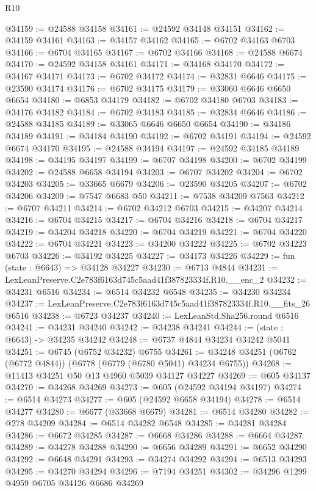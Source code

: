 \begin{lexlean}{R10}
\begin{coremodule}
@34159 := @24588 @34158
@34161 := @24592 @34148 @34151
@34162 := @34159 @34161
@34163 := @34157 @34162
@34165 := @6702 @34163 @6703
@34166 := @6704 @34165
@34167 := @6702 @34166
@34168 := @24588 @6674
@34170 := @24592 @34158 @34161
@34171 := @34168 @34170
@34172 := @34167 @34171
@34173 := @6702 @34172
@34174 := @32831 @6646
@34175 := @23590 @34174
@34176 := @6702 @34175
@34179 := @33060 @6646 @6650 @6654
@34180 := @6853 @34179
@34182 := @6702 @34180 @6703
@34183 := @34176 @34182
@34184 := @6702 @34183
@34185 := @32834 @6646
@34186 := @24588 @34185
@34189 := @33065 @6646 @6650 @6654
@34190 := @34186 @34189
@34191 := @34184 @34190
@34192 := @6702 @34191
@34194 := @24592 @6674 @34170
@34195 := @24588 @34194
@34197 := @24592 @34185 @34189
@34198 := @34195 @34197
@34199 := @6707 @34198
@34200 := @6702 @34199
@34202 := @24588 @6658 @34194
@34203 := @6707 @34202
@34204 := @6702 @34203
@34205 := @33665 @6679
@34206 := @23590 @34205
@34207 := @6702 @34206
@34209 := @7547 @6683 @50
@34211 := @7538 @34209 @7563
@34212 := @6707 @34211
@34214 := @6702 @34212 @6703
@34215 := @34207 @34214
@34216 := @6704 @34215
@34217 := @6704 @34216
@34218 := @6704 @34217
@34219 := @34204 @34218
@34220 := @6704 @34219
@34221 := @6704 @34220
@34222 := @6704 @34221
@34223 := @34200 @34222
@34225 := @6702 @34223 @6703
@34226 := @34192 @34225
@34227 := @34173 @34226
@34229 := fun (state : @6643) => @34128 @34227
@34230 := @6713 @4844
@34231 := LexLeanPreserve.C2e783f6163d745c5aad41f387823334f.R10.__enc_2
@34232 := @34231 @6516
@34234 := @6514 @34232 @6548
@34235 := @34230 @34234
@34237 := LexLeanPreserve.C2e783f6163d745c5aad41f387823334f.R10.__fits_26 @6516
@34238 := @6723 @34237
@34240 := LexLeanStd.Sha256.round @6516
@34241 := @34231 @34240
@34242 := @34238 @34241
@34244 := (state : @6643) -> @34235 @34242
@34248 := @6737 @4844 @34234 @34242 @5041
@34251 := @6745 (@6752 @34232) @6755
@34261 := @34248 @34251 (@6762 (@6772 @4844)) (@6778 (@6779 (@6780 @5041) @34234 @6755))
@34268 := @11413 @34251 @50 @13 @4960 @5039 @34127 @34227
@34269 := @605 @34137
@34270 := @34268 @34269
@34273 := @605 (@24592 @34194 @34197)
@34274 := @6514 @34273
@34277 := @605 (@24592 @6658 @34194)
@34278 := @6514 @34277
@34280 := @6677 (@33668 @6679)
@34281 := @6514 @34280
@34282 := @278 @34209
@34284 := @6514 @34282 @6548
@34285 := @34281 @34284
@34286 := @6672 @34285
@34287 := @6668 @34286
@34288 := @6664 @34287
@34289 := @34278 @34288
@34290 := @6656 @34289
@34291 := @6652 @34290
@34292 := @6648 @34291
@34293 := @34274 @34292
@34294 := @6513 @34293
@34295 := @34270 @34294
@34296 := @7194 @34251
@34302 := @34296 @1299 @4959 @6705 @34126 @6686 @34269

\end{coremodule}
\end{lexlean}

